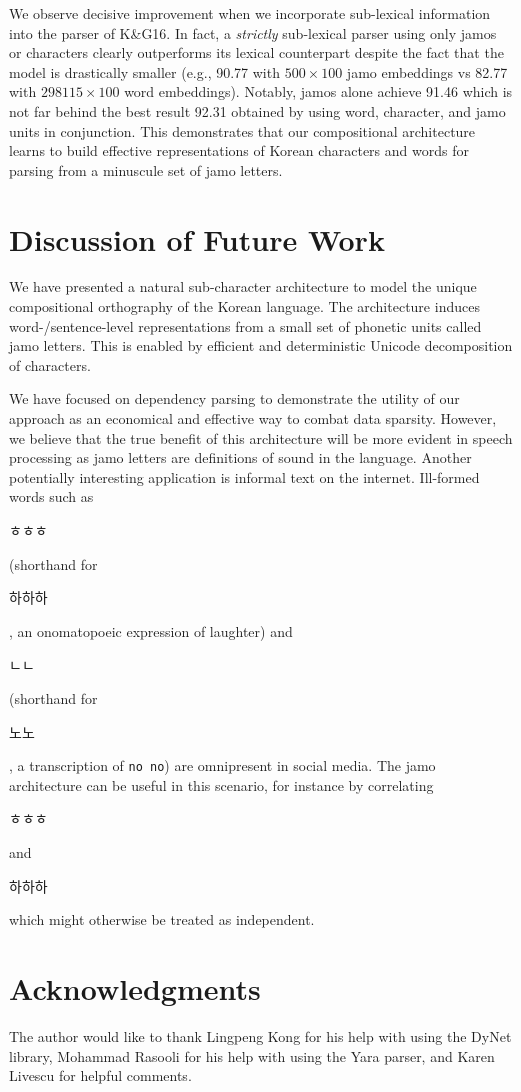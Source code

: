 \documentclass[11pt,letterpaper]{article}
\newcommand{\by}{\ensuremath{\times}}
\begin{document}
\begin{CJK}{UTF8}{gbsn}
We observe decisive improvement when we incorporate sub-lexical information into the parser of K\&G16.
In fact, a \textit{strictly} sub-lexical parser using only jamos or characters clearly outperforms its lexical counterpart
despite the fact that the model is drastically smaller (e.g., 90.77 with $500 \by 100$ jamo embeddings vs 82.77 with $298115 \by 100$ word embeddings).
Notably, jamos alone achieve 91.46 which is not far behind the best result 92.31 obtained by using word, character, and jamo units in conjunction.
This demonstrates that our compositional architecture learns to build effective representations of Korean characters and words for parsing
from a minuscule set of jamo letters.

\section{Discussion of Future Work}
\label{sec:discussion}

We have presented a natural sub-character architecture to model the unique compositional orthography of the Korean language.
The architecture induces word-/sentence-level representations from a small set of phonetic units called jamo letters.
This is enabled by efficient and deterministic Unicode decomposition of characters.

We have focused on dependency parsing to demonstrate the utility of our approach as an economical and effective way to combat data sparsity.
However, we believe that the true benefit of this architecture will be more evident in speech processing as jamo letters are definitions of sound in the language.
Another potentially interesting application is informal text on the internet.
Ill-formed words such as \begin{CJK}{UTF8}{mj}ㅎㅎㅎ\end{CJK} (shorthand for \begin{CJK}{UTF8}{mj}하하하\end{CJK}, an onomatopoeic expression of laughter)
and \begin{CJK}{UTF8}{mj} ㄴㄴ\end{CJK} (shorthand for \begin{CJK}{UTF8}{mj}노노\end{CJK}, a transcription of \texttt{no no})
are omnipresent in social media. The jamo architecture can be useful in this scenario, for instance by correlating
\begin{CJK}{UTF8}{mj}ㅎㅎㅎ\end{CJK} and \begin{CJK}{UTF8}{mj}하하하\end{CJK} which might otherwise be treated as independent.

\section*{Acknowledgments}
The author would like to thank Lingpeng Kong for his help with using the DyNet library,
Mohammad Rasooli for his help with using the Yara parser,
and Karen Livescu for helpful comments.




\clearpage\end{CJK}
\end{document}
